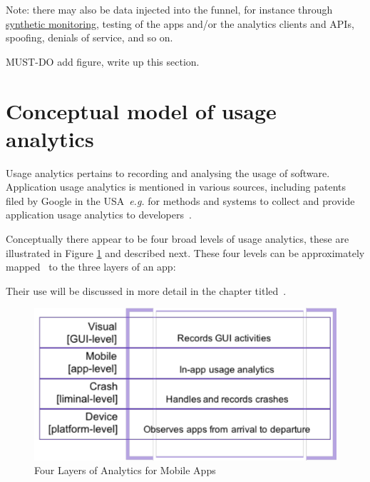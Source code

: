 Note: there may also be data injected into the funnel, for instance through \href{https://en.wikipedia.org/wiki/Synthetic_monitoring}{synthetic monitoring}, testing of the apps and/or the analytics clients and APIs, spoofing, denials of service, and so on. 

MUST-DO add figure, write up this section.




\section{Conceptual model of usage analytics}
Usage analytics pertains to recording and analysing the usage of software. Application usage analytics is mentioned in various sources, including patents filed by Google in the USA~\emph{e.g.} for methods and systems to collect and provide application usage analytics to developers~. 

Conceptually there appear to be four broad levels of usage analytics, these are illustrated in Figure \ref{fig:four-layers-of-analytics-for-mobile-apps} and described next. These four levels can be approximately mapped~ to the three layers of an app:


Their use will be discussed in more detail in the chapter titled~\href{chapter-applying-analytics-to-development-practices}{\emph{}}. %

\begin{figure}
    \includegraphics[width=\linewidth]{images/4-layers-of-analytics.pdf}
    \caption{Four Layers of Analytics for Mobile Apps}
    \label{fig:four-layers-of-analytics-for-mobile-apps}
\end{figure}

